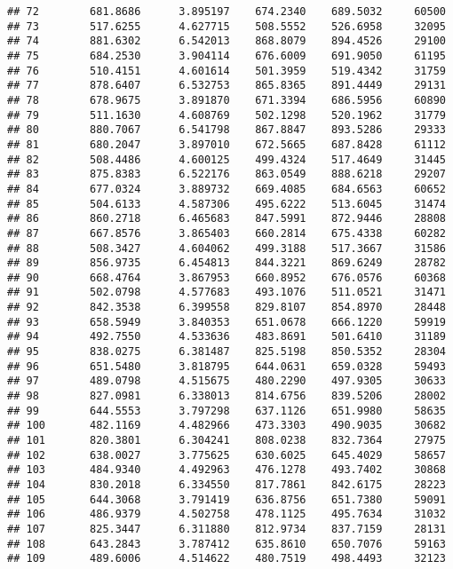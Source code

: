 \documentclass[]{article}
\begin{document}
\begin{verbatim}
## 72        681.8686      3.895197    674.2340    689.5032     60500
## 73        517.6255      4.627715    508.5552    526.6958     32095
## 74        881.6302      6.542013    868.8079    894.4526     29100
## 75        684.2530      3.904114    676.6009    691.9050     61195
## 76        510.4151      4.601614    501.3959    519.4342     31759
## 77        878.6407      6.532753    865.8365    891.4449     29131
## 78        678.9675      3.891870    671.3394    686.5956     60890
## 79        511.1630      4.608769    502.1298    520.1962     31779
## 80        880.7067      6.541798    867.8847    893.5286     29333
## 81        680.2047      3.897010    672.5665    687.8428     61112
## 82        508.4486      4.600125    499.4324    517.4649     31445
## 83        875.8383      6.522176    863.0549    888.6218     29207
## 84        677.0324      3.889732    669.4085    684.6563     60652
## 85        504.6133      4.587306    495.6222    513.6045     31474
## 86        860.2718      6.465683    847.5991    872.9446     28808
## 87        667.8576      3.865403    660.2814    675.4338     60282
## 88        508.3427      4.604062    499.3188    517.3667     31586
## 89        856.9735      6.454813    844.3221    869.6249     28782
## 90        668.4764      3.867953    660.8952    676.0576     60368
## 91        502.0798      4.577683    493.1076    511.0521     31471
## 92        842.3538      6.399558    829.8107    854.8970     28448
## 93        658.5949      3.840353    651.0678    666.1220     59919
## 94        492.7550      4.533636    483.8691    501.6410     31189
## 95        838.0275      6.381487    825.5198    850.5352     28304
## 96        651.5480      3.818795    644.0631    659.0328     59493
## 97        489.0798      4.515675    480.2290    497.9305     30633
## 98        827.0981      6.338013    814.6756    839.5206     28002
## 99        644.5553      3.797298    637.1126    651.9980     58635
## 100       482.1169      4.482966    473.3303    490.9035     30682
## 101       820.3801      6.304241    808.0238    832.7364     27975
## 102       638.0027      3.775625    630.6025    645.4029     58657
## 103       484.9340      4.492963    476.1278    493.7402     30868
## 104       830.2018      6.334550    817.7861    842.6175     28223
## 105       644.3068      3.791419    636.8756    651.7380     59091
## 106       486.9379      4.502758    478.1125    495.7634     31032
## 107       825.3447      6.311880    812.9734    837.7159     28131
## 108       643.2843      3.787412    635.8610    650.7076     59163
## 109       489.6006      4.514622    480.7519    498.4493     32123

\end{verbatim}
\end{document}
